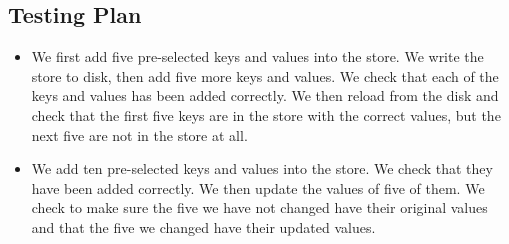 \subsection{Testing Plan}
\begin{itemize}
\item We first add five pre-selected keys and values into the store. We write the store to disk, then add five more keys and values. We check that each of the keys and values has been added correctly. We then reload from the disk and check that the first five keys are in the store with the correct values, but the next five are not in the store at all.
\item We add ten pre-selected keys and values into the store. We check that they have been added correctly. We then update the values of five of them. We check to make sure the five we have not changed have their original values and that the five we changed have their updated values.
\end{itemize}
